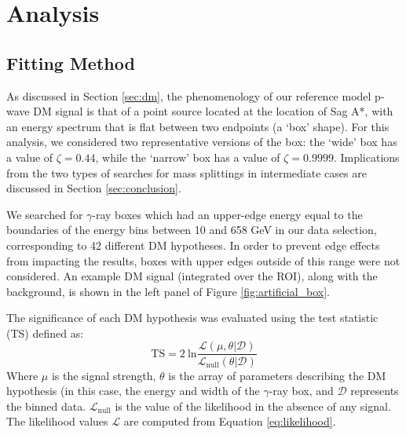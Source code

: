 
\section{Analysis}\label{sec:analysis}


\subsection{Fitting Method}\label{sec:fitting}
As discussed in Section \ref{sec:dm}, the phenomenology of our reference model p-wave DM signal is that of a point source located at the location of Sag A*, with an energy spectrum that is flat between two endpoints (a `box' shape).
For this analysis, we considered two representative versions of the box: the `wide' box has a value of $\zeta = 0.44$, while the `narrow' box has a value of $\zeta = 0.9999$.
Implications from the two types of searches for mass splittings in intermediate cases are discussed in Section \ref{sec:conclusion}.

We searched for $\gamma$-ray boxes which had an upper-edge energy equal to the boundaries of the energy bins between 10 and 658 GeV in our data selection, corresponding to 42 different DM hypotheses.
In order to prevent edge effects from impacting the results, boxes with upper edges outside of this range were not considered. 
An example DM signal (integrated over the ROI), along with the background, is shown in the left panel of Figure \ref{fig:artificial_box}. 

The significance of each DM hypothesis was evaluated using the test statistic (TS) defined as: 
\begin{equation}
\mathrm{TS}=2~\mathrm{ln}\frac{\mathcal{L}(\mu, \theta | \mathcal{D})}{\mathcal{L}_{\mathrm{null}}(\theta | \mathcal{D})} \label{eq:ts}
\end{equation}
Where $\mu$ is the signal strength, $\theta$ is the array of parameters describing the DM hypothesis (in this case, the energy and width of the $\gamma$-ray box, and $\mathcal{D}$ represents the binned data. $\mathcal{L}_{\mathrm{null}}$ is the value of the likelihood in the absence of any signal.
The likelihood values $\mathcal{L}$ are computed from Equation \ref{eq:likelihood}.

